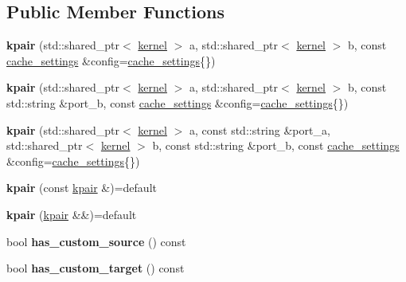 \subsection*{Public Member Functions}
\begin{DoxyCompactItemize}
\item 
\mbox{\label{classral_1_1cache_1_1kpair_adfd8907b7eb849f0678c6102454b04c5}} 
{\bfseries kpair} (std\+::shared\+\_\+ptr$<$ \hyperlink{classral_1_1cache_1_1kernel}{kernel} $>$ a, std\+::shared\+\_\+ptr$<$ \hyperlink{classral_1_1cache_1_1kernel}{kernel} $>$ b, const \hyperlink{structral_1_1cache_1_1cache__settings}{cache\+\_\+settings} \&config=\hyperlink{structral_1_1cache_1_1cache__settings}{cache\+\_\+settings}\{\})
\item 
\mbox{\label{classral_1_1cache_1_1kpair_a4e75a8cd2ae6642e08ac3edc3c6a99fa}} 
{\bfseries kpair} (std\+::shared\+\_\+ptr$<$ \hyperlink{classral_1_1cache_1_1kernel}{kernel} $>$ a, std\+::shared\+\_\+ptr$<$ \hyperlink{classral_1_1cache_1_1kernel}{kernel} $>$ b, const std\+::string \&port\+\_\+b, const \hyperlink{structral_1_1cache_1_1cache__settings}{cache\+\_\+settings} \&config=\hyperlink{structral_1_1cache_1_1cache__settings}{cache\+\_\+settings}\{\})
\item 
\mbox{\label{classral_1_1cache_1_1kpair_abec39e0081da8f31ad4bc3688cf90c07}} 
{\bfseries kpair} (std\+::shared\+\_\+ptr$<$ \hyperlink{classral_1_1cache_1_1kernel}{kernel} $>$ a, const std\+::string \&port\+\_\+a, std\+::shared\+\_\+ptr$<$ \hyperlink{classral_1_1cache_1_1kernel}{kernel} $>$ b, const std\+::string \&port\+\_\+b, const \hyperlink{structral_1_1cache_1_1cache__settings}{cache\+\_\+settings} \&config=\hyperlink{structral_1_1cache_1_1cache__settings}{cache\+\_\+settings}\{\})
\item 
\mbox{\label{classral_1_1cache_1_1kpair_afc0543bd566469749f17d1b95ee9f2c4}} 
{\bfseries kpair} (const \hyperlink{classral_1_1cache_1_1kpair}{kpair} \&)=default
\item 
\mbox{\label{classral_1_1cache_1_1kpair_a5516e9525b807e652b1b3249e35dd579}} 
{\bfseries kpair} (\hyperlink{classral_1_1cache_1_1kpair}{kpair} \&\&)=default
\item 
\mbox{\label{classral_1_1cache_1_1kpair_ace7cd04fde66e6f182b11b4811c351c5}} 
bool {\bfseries has\+\_\+custom\+\_\+source} () const
\item 
\mbox{\label{classral_1_1cache_1_1kpair_af1f4d0a9980fa612df0517956248870b}} 
bool {\bfseries has\+\_\+custom\+\_\+target} () const
\end{DoxyCompactItemize}
